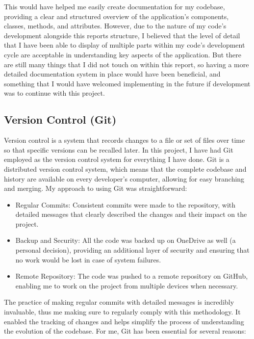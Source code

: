 \documentclass{article}
\begin{document}
This would have helped me easily create documentation for my codebase, providing a clear and structured overview of the application's components, classes, methods, and attributes. However, due to the nature of my code's development alongside this reports structure, I believed that the level of detail that I have been able to display of multiple parts within my code's development cycle are acceptable in understanding key aspects of the application. But there are still many things that I did not touch on within this report, so having a more detailed documentation system in place would have been beneficial, and something that I would have welcomed implementing in the future if development was to continue with this project.\\\vspace{0.3cm}

\subsection{Version Control (Git)} 

Version control is a system that records changes to a file or set of files over time so that specific versions can be recalled later. In this project, I have had Git employed as the version control system for everything I have done.
Git is a distributed version control system, which means that the complete codebase and history are available on every developer's computer, allowing for easy branching and merging. My approach to using Git was straightforward:

\begin{itemize}
    \item Regular Commits: Consistent commits were made to the repository, with detailed messages that clearly described the changes and their impact on the project.
    \item Backup and Security: All the code was backed up on OneDrive as well (a personal decision), providing an additional layer of security and ensuring that no work would be lost in case of system failures.
    \item Remote Repository: The code was pushed to a remote repository on GitHub, enabling me to work on the project from multiple devices when necessary.
\end{itemize}
\newpage
The practice of making regular commits with detailed messages is incredibly invaluable, thus me making sure to regularly comply with this methodology. It enabled the tracking of changes and helps simplify the process of understanding the evolution of the codebase. For me, Git has been essential for several reasons:
\end{document}
